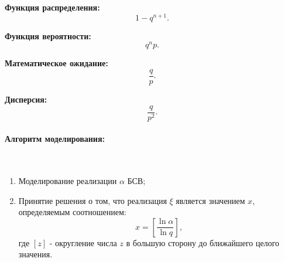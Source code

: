 \textbf{Функция распределения:}
\begin{equation}
	1 - q^{n+1}.
\end{equation}

\textbf{Функция вероятности:}
\begin{equation}
	q^{n}p.
\end{equation}

\textbf{Математическое ожидание:}
\begin{equation}
	\frac{q}{p}.
\end{equation}

\textbf{Дисперсия:}
\begin{equation}
	\frac{q}{p^{2}}.
\end{equation}

\paragraph{Алгоритм моделирования:}\
\

\begin{enumerate}
	\item Моделирование реализации $\alpha$ БСВ;
	\item Принятие решения о том, что реализация $\xi$ является значением $x$, определяемым соотношением:
	      \begin{equation}
		      x = \left[ \frac{\ln \alpha}{\ln q} \right],
	      \end{equation}
	      где $[z]$ - округление числа $z$ в большую сторону до ближайшего целого значения.
\end{enumerate}
